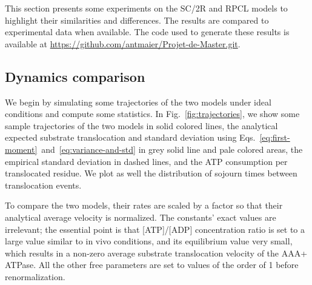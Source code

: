 This section presents some experiments on the SC/2R and RPCL models to highlight their similarities and differences. The results are compared to experimental data when available. The code used to generate these results is available at \url{https://github.com/antmaier/Projet-de-Master.git}.

\subsection{Dynamics comparison}
    We begin by simulating some trajectories of the two models under ideal conditions and compute some statistics. In Fig.~\ref{fig:trajectories}, we show some sample trajectories of the two models in solid colored lines, the analytical expected substrate translocation and standard deviation using Eqs.~\eqref{eq:first-moment}~and~\eqref{eq:variance-and-std} in grey solid line and pale colored areas, the empirical standard deviation in dashed lines, and the ATP consumption per translocated residue. We plot as well the distribution of sojourn times between translocation events.

    To compare the two models, their rates are scaled by a factor so that their analytical average velocity is normalized. The constants' exact values are irrelevant; the essential point is that [ATP]/[ADP] concentration ratio is set to a large value similar to in vivo conditions, and its equilibrium value very small, which results in a non-zero average substrate translocation velocity of the AAA+ ATPase. All the other free parameters are set to values of the order of 1 before renormalization.

